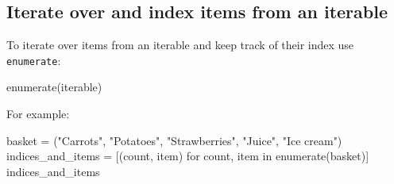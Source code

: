 \subsection{Iterate over and index items from an iterable}
\label{\detokenize{building-tools/01-variables-conditionals-loops/how/main:iterate-over-and-index-items-from-an-iterable}}

To iterate over items from an iterable and keep track of their index use
\texttt{enumerate}:


\begin{api}
enumerate(iterable)
\end{api}



For example:




\begin{pyin}
basket = ("Carrots", "Potatoes", "Strawberries", "Juice", "Ice cream")
indices_and_items = [(count, item) for count, item in enumerate(basket)]
indices_and_items
\end{pyin}





\begin{raw}
\end{raw}







